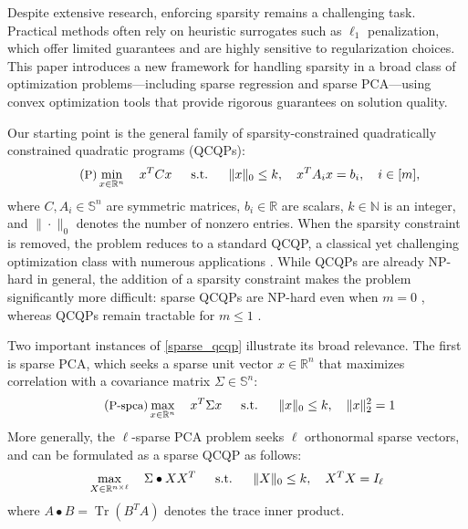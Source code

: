 \documentclass[11pt]{amsart}
\theoremstyle{plain}
\theoremstyle{definition}
\theoremstyle{remark}
\newcommand{\RR}{\mathbb{R}}
\renewcommand{\SS}{{\mathbb{S}}}
\newcommand{\NN}{{\mathbb{N}}}
\newcommand{\st}{\text{\, s.t.\, }}
\DeclareMathOperator{\tr}{Tr}
\begin{document}
	Despite extensive research, enforcing sparsity remains a challenging task.
	Practical methods often rely on heuristic surrogates such as $\ell_1$ penalization, which offer limited guarantees and are highly sensitive to regularization choices.
	This paper introduces a new framework for handling sparsity in a broad class of optimization problems---including sparse regression and sparse PCA---using convex optimization tools that provide rigorous guarantees on solution quality.
	
	Our starting point is the general family of sparsity-constrained {quadratically constrained quadratic programs} (QCQPs):
	\begin{equation}\label{sparse_qcqp}\tag{\small{P}}
		\min_{x\in\RR^n}\quad x^T C x
		\quad\st\quad \|x\|_0\leq k,\quad
		x^T A_i x = b_i,\quad i\in [m],
	\end{equation}
	where $C,A_i\in \SS^n$ are symmetric matrices, $b_i \in \RR$ are scalars, $k \in \NN$ is an integer, and $\|\cdot\|_0$ denotes the number of nonzero entries.
	When the sparsity constraint is removed, the problem reduces to a standard QCQP, a classical yet challenging optimization class with numerous applications \cite{nemirovski1999maximization, ben2001lectures, bao2011semidefinite, aholt2012qcqp, luo2010semidefinite, cifuentes2021convex, cifuentes2022local}.
	While QCQPs are already NP-hard in general, the addition of a sparsity constraint makes the problem significantly more difficult: sparse QCQPs are NP-hard even when $m=0$ \cite{bienstock1996computational, natarajan1995sparse, pardalos1991quadratic}, whereas QCQPs remain tractable for $m \leq 1$ \cite{sturm2003cones, pong2014generalized, ben2001lectures}.
	
	Two important instances of \eqref{sparse_qcqp} illustrate its broad relevance.
	The first is {sparse PCA}, which seeks a sparse unit vector $x \in \RR^n$ that maximizes correlation with a covariance matrix $\Sigma \in \SS^n$:
	\begin{equation}\label{sparse_pca}\tag{\small{P-spca}}
		\max_{x\in\RR^n}\quad
		x^T \Sigma x\quad\st\quad \|x\|_0\leq k,\quad \|x\|_2^2 = 1 
	\end{equation}
	More generally, the $\ell$-sparse PCA problem seeks $\ell$ orthonormal sparse vectors,
	and can be formulated as a sparse QCQP as follows:
	\begin{equation*}%
		\max_{X\in\RR^{n\times \ell}}\quad
		\Sigma \bullet X X^T \quad\st\quad \|X\|_0\leq k,\quad X^T X = I_\ell 
	\end{equation*}
	where $A \bullet B = \tr(B^T A)$ denotes the trace inner product.
	
\end{document}
